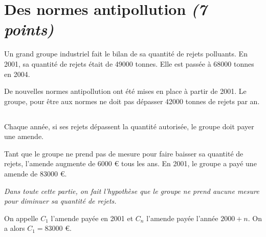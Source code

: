 \section{Des normes antipollution \textit{(7 points)}}

Un grand groupe industriel fait le bilan de sa quantité de rejets polluants. En 2001, sa quantité de rejets était de \num{49000} tonnes. Elle est passée à \num{68000} tonnes en 2004.


De nouvelles normes antipollution ont été mises en place à partir de 2001. Le groupe, pour être aux normes ne doit pas dépasser \num{42000} tonnes de rejets par an.

\subsection{}
Chaque année, si ses rejets dépassent la quantité autorisée, le groupe doit payer une amende.

Tant que le groupe ne prend pas de mesure pour faire baisser sa quantité de rejets, l'amende augmente de \num{6000} € tous les ans. En 2001, le groupe a payé une amende de \num{83000} €.

\textit{Dans toute cette partie, on fait l'hypothèse que le groupe ne prend aucune mesure pour diminuer sa quantité de rejets.}

On appelle $C_1$ l'amende payée en 2001 et $C_n$ l'amende payée l'année $2000 + n$. On a alors $C_1 = \num{83000}$ €.\\

